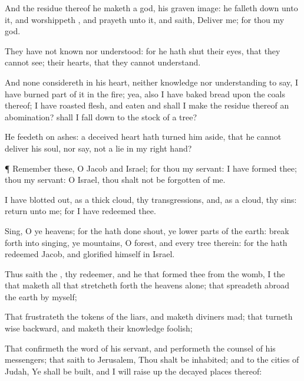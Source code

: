 {And the
residue thereof he
maketh a
god,
{} his graven
image: he falleth
down unto it, and
worshippeth
{}, and
prayeth unto it, and
saith,
Deliver me; for thou
{} my
god.

They have not
known nor
understood: for he hath
shut their
eyes, that they cannot
see;
{} their
hearts, that they cannot
understand.

And none
considereth in his
heart, neither
{}
knowledge nor
understanding to
say, I have
burned
part of it
in the
fire; yea, also I have
baked
bread upon the
coals thereof; I have
roasted
flesh, and
eaten
{} and shall I
make the
residue thereof an
abomination? shall I fall
down to the
stock of a
tree?

He
feedeth on
ashes: a
deceived
heart hath turned him
aside, that he cannot
deliver his
soul, nor
say,
{} not a
lie in my right
hand?


\par }{\PP {}¶
Remember these, O
Jacob and
Israel; for thou
{} my
servant: I have
formed thee; thou
{} my
servant: O
Israel, thou shalt not be
forgotten of me.

I have blotted
out, as a thick
cloud, thy
transgressions, and, as a
cloud, thy
sins:
return unto me; for I have
redeemed thee.

Sing, O ye
heavens; for the
{} hath
done
{}
shout, ye lower
parts of the
earth: break
forth into
singing, ye
mountains, O
forest, and every
tree therein: for the
{} hath
redeemed
Jacob, and
glorified himself in
Israel.

Thus
saith the
{}, thy
redeemer, and he that
formed thee from the
womb, I
{} the
{} that
maketh all
{} that stretcheth
forth the
heavens alone; that spreadeth
abroad the
earth by myself;

That
frustrateth the
tokens of the
liars, and maketh
diviners
mad; that
turneth
wise
{}
backward, and maketh their
knowledge
foolish;

That
confirmeth the
word of his
servant, and
performeth the
counsel of his
messengers; that
saith to
Jerusalem, Thou shalt be
inhabited; and to the
cities of
Judah, Ye shall be
built, and I will raise
up the decayed
places thereof:

}
